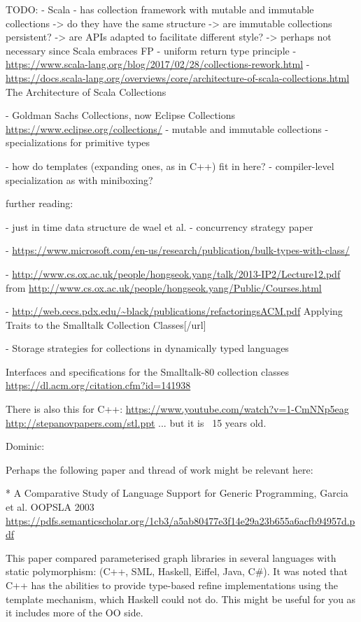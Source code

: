 \documentclass[sigconf, 10pt]{acmart}
\begin{document}
\begin{note}
TODO:
- Scala
  - has collection framework with mutable and immutable collections
    -> do they have the same structure 
    -> are immutable collections persistent?
    -> are APIs adapted to facilitate different style?
      -> perhaps not necessary since Scala embraces FP
  - uniform return type principle
  - \url{https://www.scala-lang.org/blog/2017/02/28/collections-rework.html}
 - \url{https://docs.scala-lang.org/overviews/core/architecture-of-scala-collections.html} 
   The Architecture of Scala Collections  

- Goldman Sachs Collections, now Eclipse Collections
\url{https://www.eclipse.org/collections/}
 - mutable and immutable collections
 - specializations for primitive types

- how do templates (expanding ones, as in C++) fit in here?
- compiler-level specialization as with miniboxing?

further reading:

- just in time data structure de wael et al.
- concurrency strategy paper

 - \url{https://www.microsoft.com/en-us/research/publication/bulk-types-with-class/}

 - \url{http://www.cs.ox.ac.uk/people/hongseok.yang/talk/2013-IP2/Lecture12.pdf}
   from \url{http://www.cs.ox.ac.uk/people/hongseok.yang/Public/Courses.html}
 
 - \url{http://web.cecs.pdx.edu/~black/publications/refactoringsACM.pdf}
   Applying Traits to the Smalltalk Collection Classes[/url]
 
 - Storage strategies for collections in dynamically typed languages \citep{Bolz:2013:SSC}

Interfaces and specifications for the Smalltalk-80 collection classes
\url{https://dl.acm.org/citation.cfm?id=141938}


There is also this for C++:
 \url{https://www.youtube.com/watch?v=1-CmNNp5eag}
 \url{http://stepanovpapers.com/stl.ppt}
... but it is ~15 years old.



Dominic:

Perhaps the following paper and thread of work might be relevant here:

* A Comparative Study of Language Support for Generic Programming, Garcia et al. OOPSLA 2003
\url{https://pdfs.semanticscholar.org/1cb3/a5ab80477e3f14e29a23b655a6acfb94957d.pdf}

This paper compared parameterised graph libraries in several languages with static polymorphism: (C++, SML, Haskell, Eiffel, Java, C\#). It was noted that C++ has the abilities to provide type-based refine implementations using the template mechanism, which Haskell could not do. This might be useful for you as it includes more of the OO side.


\end{note}
\end{document}
